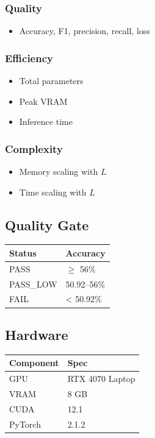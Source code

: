 \subsubsection{Quality}
\begin{itemize}
\item Accuracy, F1, precision, recall, loss

\end{itemize}
\subsubsection{Efficiency}
\begin{itemize}
\item Total parameters
\item Peak VRAM
\item Inference time

\end{itemize}
\subsubsection{Complexity}
\begin{itemize}
\item Memory scaling with $L$
\item Time scaling with $L$

\end{itemize}
\subsection{Quality Gate}

\begin{table}[H]
\centering
\small
\begin{tabular}{ll}
\toprule
\textbf{Status} & \textbf{Accuracy} \\
\midrule
PASS & $\ge$ 56\% \\
PASS\_LOW & 50.92--56\% \\
FAIL & \textless{} 50.92\% \\
\bottomrule
\end{tabular}
\end{table}

\subsection{Hardware}

\begin{table}[H]
\centering
\small
\begin{tabular}{ll}
\toprule
\textbf{Component} & \textbf{Spec} \\
\midrule
GPU & RTX 4070 Laptop \\
VRAM & 8 GB \\
CUDA & 12.1 \\
PyTorch & 2.1.2 \\
\bottomrule
\end{tabular}
\end{table}

